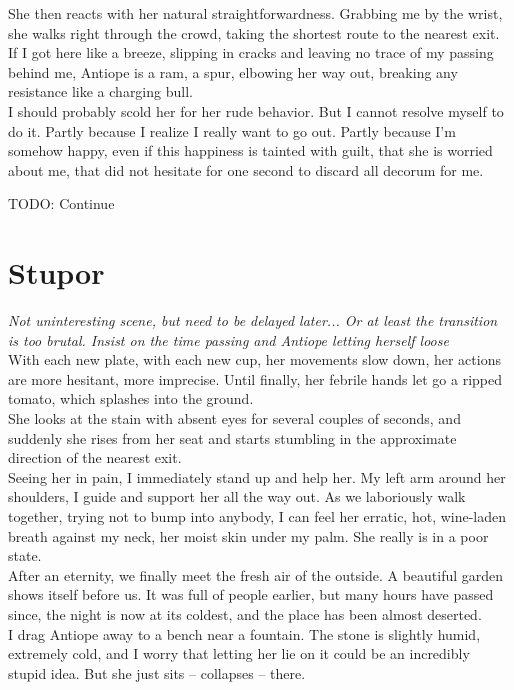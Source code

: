 \documentclass{report}
\newcommand{\dcomment}[1]{
	\emph{#1}
	\\
}
\newcommand{\gsection}[1]{
	\section*{#1}
	\label{#1}
}
\begin{document}
She then reacts with her natural straightforwardness. Grabbing me by the wrist, she walks right through the crowd, taking the shortest route to the nearest exit. If I got here like a breeze, slipping in cracks and leaving no trace of my passing behind me, Antiope is a ram, a spur, elbowing her way out, breaking any resistance like a charging bull.\\

I should probably scold her for her rude behavior. But I cannot resolve myself to do it. Partly because I realize I really want to go out. Partly because I'm somehow happy, even if this happiness is tainted with guilt, that she is worried about me, that did not hesitate for one second to discard all decorum for me.

TODO: Continue

\gsection{Stupor}

\dcomment{
	Not uninteresting scene, but need to be delayed later... Or at least the transition is too brutal. Insist on the time passing and Antiope letting herself loose
}

With each new plate, with each new cup, her movements slow down, her actions are more hesitant, more imprecise. Until finally, her febrile hands let go a ripped tomato, which splashes into the ground.\\

She looks at the stain with absent eyes for several couples of seconds, and suddenly she rises from her seat and starts stumbling in the approximate direction of the nearest exit.\\

Seeing her in pain, I immediately stand up and help her. My left arm around her shoulders, I guide and support her all the way out. As we laboriously walk together, trying not to bump into anybody, I can feel her erratic, hot, wine-laden breath against my neck, her moist skin under my palm. She really is in a poor state.\\

After an eternity, we finally meet the fresh air of the outside. A beautiful garden shows itself before us. It was full of people earlier, but many hours have passed since, the night is now at its coldest, and the place has been almost deserted.\\

I drag Antiope away to a bench near a fountain. The stone is slightly humid, extremely cold, and I worry that letting her lie on it could be an incredibly stupid idea. But she just sits – collapses – there.\\
\end{document}
